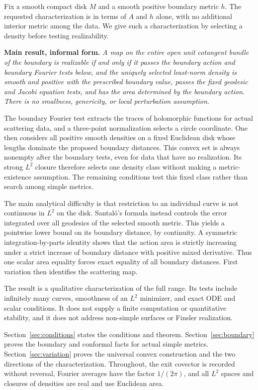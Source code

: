 \documentclass[11pt]{article}
\theoremstyle{remark}
\begin{document}
Fix a smooth compact disk $M$ and a smooth positive boundary metric $h$.
The requested characterization is in terms of $A$ and $h$ alone, with
no additional interior metric among the data. We give such a characterization
by selecting a density before testing realizability.

\medskip
\noindent\textbf{Main result, informal form.}
\emph{A map on the entire open unit cotangent bundle of the boundary is
realizable if and only if it passes the boundary action and boundary
Fourier tests below, and the uniquely selected least-norm density is smooth
and positive with the prescribed boundary value, passes the fixed
geodesic and Jacobi equation tests, and has the area determined by the
boundary action. There is no smallness, genericity, or local perturbation
assumption.}
\medskip

The boundary Fourier test extracts the traces of holomorphic functions
for actual scattering data, and a three-point normalization selects a
circle coordinate. One then considers all positive smooth densities on
a fixed Euclidean disk whose lengths dominate the proposed boundary
distances. This convex set is always nonempty after the boundary tests,
even for data that have no realization. Its strong $L^2$ closure therefore
selects one density class without making a metric-existence assumption.
The remaining conditions test this fixed class rather than search among
simple metrics.

The main analytical difficulty is that restriction to an individual curve
is not continuous in $L^2$ on the disk. Santal\'o's formula instead controls
the error integrated over all geodesics of the selected smooth metric.
This yields a pointwise lower bound on its boundary distance, by continuity.
A symmetric integration-by-parts identity shows that the action area is
strictly increasing under a strict increase of boundary distance with
positive mixed derivative. Thus one scalar area equality forces exact
equality of all boundary distances. First variation then identifies the
scattering map.

The result is a qualitative characterization of the full range. Its tests
include infinitely many curves, smoothness of an $L^2$ minimizer, and exact
ODE and scalar conditions. It does not supply a finite computation or
quantitative stability, and it does not address non-simple surfaces or
Finsler realization.

Section~\ref{sec:conditions} states the conditions and theorem.
Section~\ref{sec:boundary} proves the boundary and conformal facts for
actual simple metrics. Section~\ref{sec:variation} proves the universal
convex construction and the two directions of the characterization.
Throughout, the exit covector is recorded without reversal, Fourier
averages have the factor $1/(2\pi)$, and all $L^2$ spaces and closures of
densities are real and use Euclidean area.
\end{document}
